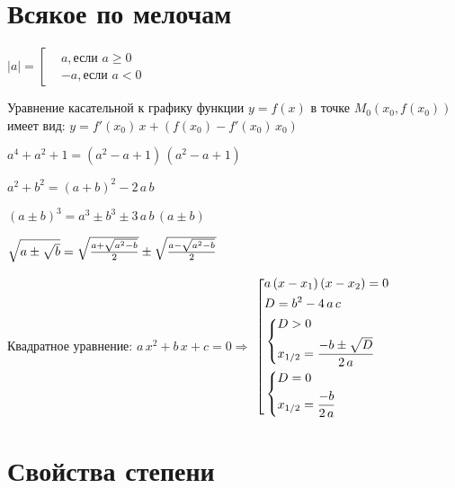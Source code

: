 ﻿\section{Всякое по мелочам}

$ |a| = \left[ \begin{aligned}
	& a,\text{если\ } a\ge 0 \\
	& -a,\text{если\ } a < 0
\end{aligned}\right. $

\begin{center}
	Уравнение касательной к графику функции $\displaystyle y = f(x) $ в точке $\displaystyle M_0(x_0, f(x_0)) $ имеет вид:
	$ y = f'(x_0)\, x + (f(x_0) - f'(x_0)\, x_0) $
\end{center}

$ a^4 + a^2 + 1 = (a^2 - a + 1)\, (a^2 - a + 1) $

$ a^2 + b^2 = (a + b)^2 - 2\, a\, b $

$ (a \pm b)^3 = a^3\pm b^3\pm 3\, a\, b\, (a\pm b) $

$ \sqrt{\mathstrut a\pm \sqrt{\mathstrut b}} = \sqrt{\mathstrut \frac{a + \sqrt{\mathstrut a^2 - b}}{2}}\pm \sqrt{\mathstrut \frac{a - \sqrt{\mathstrut a^2 - b}}{2}} $

\begin{center}
	Квадратное уравнение:
	$ a\, x^2 + b\, x + c = 0 \Rightarrow $ $ \left[ \begin{aligned}
		& a\, (x - x_1)\, (x - x_2) = 0 \\
		& D = b^2 - 4\, a\, c \\
		& \left\{ \begin{aligned}
			& D > 0 \\
			& x_{1/2} = \frac{-b\pm \sqrt{\mathstrut D}}{2\, a}
		\end{aligned}\right. \\
		& \left\{ \begin{aligned}
			& D = 0 \\
			& x_{1/2} = \frac{-b}{2\, a}
		\end{aligned}\right.
	\end{aligned}\right. $
\end{center}


\section{Свойства степени}

